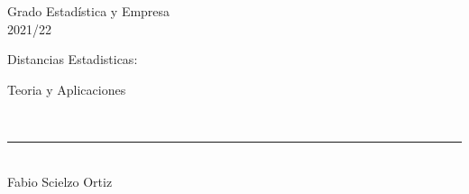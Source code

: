 \documentclass[12pt]{report} %
\begin{document}
	
	\begin{titlepage}
		\begin{sffamily}
			\color{azulUC3M}
			\begin{center}
				\begin{figure}[H] %
				\end{figure}
			\vspace{2.5cm}
				\begin{Large}
					Grado Estadística y Empresa\\			
					2021/22\\
					\vspace{1cm}		
					\bigskip
					
				\end{Large}
				{\Huge Distancias Estadisticas: \\ \vspace*{0.3cm}
				
				Teoria y Aplicaciones }\\
				\vspace*{0.5cm}
				\rule{10.5cm}{0.1mm}\\
				\vspace*{0.9cm}
				{\LARGE Fabio Scielzo Ortiz}\\ 
				\vspace*{1cm}
				\begin{Large}
				\end{Large}
			\end{center}
			\vfill
			\color{black}
			
		\end{sffamily}
	\end{titlepage}
	
\end{document}
